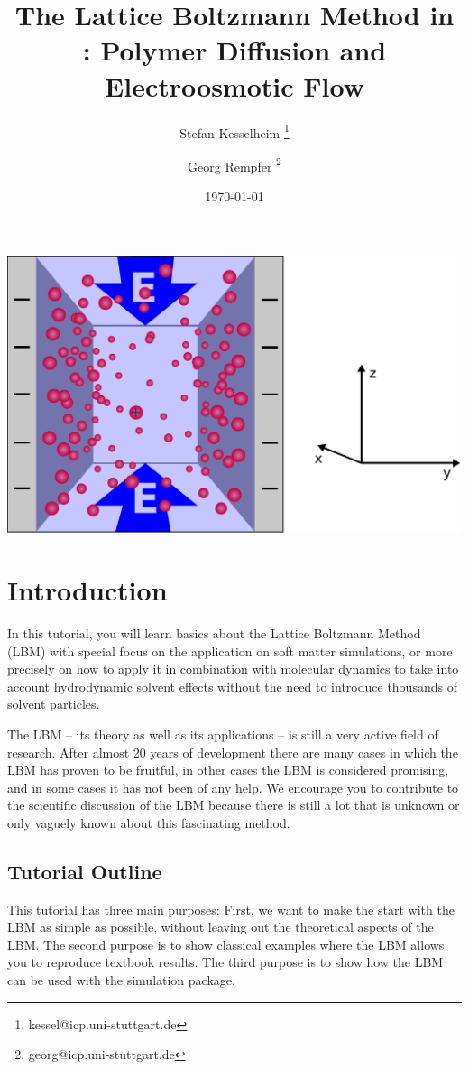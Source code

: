 \renewcommand{\d}{\mathrm d}
\subject{ESPResSo Tutorial}
\title{The Lattice Boltzmann Method in \ES{}: 
Polymer Diffusion and Electroosmotic Flow
} \author{ Stefan Kesselheim \thanks{\ttfamily 
kessel@icp.uni-stuttgart.de}  \and  Georg Rempfer \thanks{\ttfamily 
georg@icp.uni-stuttgart.de}}
\date{\today}
\publishers{Institute for Computational Physics, Stuttgart University}
\maketitle 
\begin{center}
  \includegraphics[width=0.5\columnwidth]{../figs/schlitzpore_3d.pdf}
\end{center}
\tableofcontents



 \chapter{Introduction}
In this tutorial, you will learn basics about the 
Lattice Boltzmann Method (LBM) with special focus on the application
on soft matter simulations, or more precisely on how to apply it 
in combination with molecular dynamics to take into account 
hydrodynamic solvent effects without the need to introduce
thousands of solvent particles. 

The LBM -- its theory as well as its applications -- is 
still a very active field of research. After almost 20 years
of development there are many cases in which the LBM has proven
to be fruitful, in other cases the LBM is considered promising,
and in some cases it has not been of any help. We
encourage you to contribute to the scientific discussion 
of the LBM because there is still a lot 
that is unknown or only vaguely known about this fascinating
method. 

\section*{Tutorial Outline}
This tutorial has three main purposes: First, we want to make the start
with the LBM as simple as possible, without leaving out the theoretical
aspects of the LBM.
The second purpose is to show classical examples where the LBM allows 
you to reproduce textbook results.
The third purpose is to show how the LBM can be used with the
\ES{} simulation package. 

